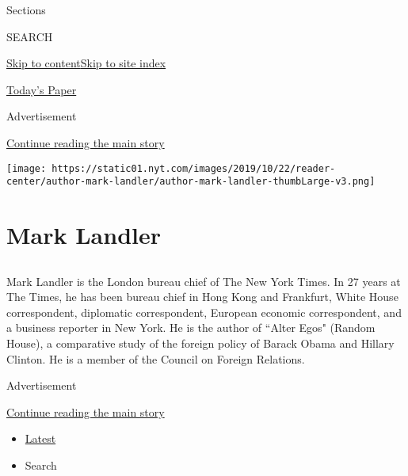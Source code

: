 Sections

SEARCH

\protect\hyperlink{site-content}{Skip to
content}\protect\hyperlink{site-index}{Skip to site index}

\href{https://myaccount.nytimes.com/auth/login?response_type=cookie\&client_id=vi}{}

\href{https://www.nytimes.com/section/todayspaper}{Today's Paper}

Advertisement

\protect\hyperlink{after-top}{Continue reading the main story}

\texttt{[image: https://static01.nyt.com/images/2019/10/22/reader-center/author-mark-landler/author-mark-landler-thumbLarge-v3.png]}

\hypertarget{mark-landler}{%
\section{Mark Landler}\label{mark-landler}}

\subsection{}

Mark Landler is the London bureau chief of The New York Times. In 27
years at The Times, he has been bureau chief in Hong Kong and Frankfurt,
White House correspondent, diplomatic correspondent, European economic
correspondent, and a business reporter in New York. He is the author of
``Alter Egos" (Random House), a comparative study of the foreign policy
of Barack Obama and Hillary Clinton. He is a member of the Council on
Foreign Relations.

Advertisement

\protect\hyperlink{after-mid1}{Continue reading the main story}

\begin{itemize}
\tightlist
\item
  \protect\hyperlink{stream-panel}{Latest}
\item
  Search
\end{itemize}

